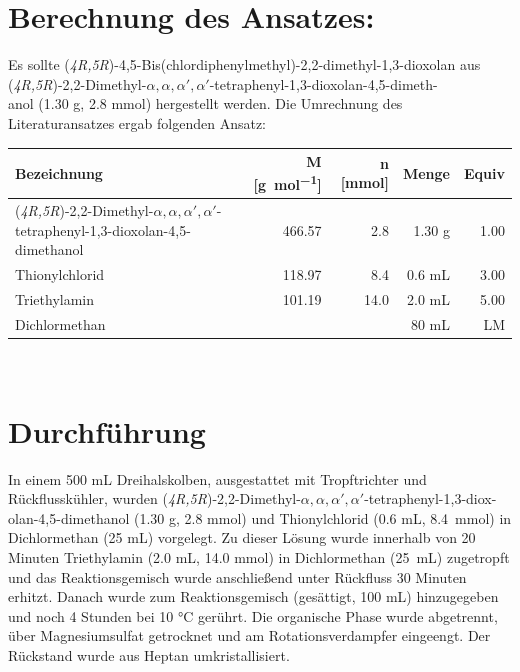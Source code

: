 \documentclass[12pt]{article}
\begin{document}
\begin{onehalfspace}

\section{Berechnung des Ansatzes: }
Es sollte (\textit{4R,5R})-4,5-Bis(chlordiphenylmethyl)-2,2-dimethyl-1,3-dioxolan aus (\textit{4R,5R})-2,2-Dimethyl-$\alpha ,\alpha ,\alpha ',\alpha '$-tetraphenyl-1,3-dioxolan-4,5-dimeth-\\anol (1.30 \si{\gram}, 2.8 mmol) hergestellt werden. Die Umrechnung des Literaturansatzes ergab folgenden Ansatz:\cite{vor}

\begin{table}
\begin{tabularx}{\textwidth}{Xrrrr}
\toprule
\textbf{ Bezeichnung }&\textbf{M [\si{\gram\per\mol}]} & \textbf{ n [\si{\milli\mol}]} & \textbf{Menge} & \textbf{Equiv}\\
\midrule
(\textit{4R,5R})-2,2-Dimethyl-$\alpha ,\alpha ,\alpha ',\alpha '$-tetraphenyl-1,3-dioxolan-4,5-dimethanol & 466.57 & 2.8  & 1.30 \si{\gram} & 1.00 \\
 Thionylchlorid  & 118.97   &  8.4  &  0.6 \si{\milli\liter} & 3.00 \\
 Triethylamin    & 101.19   &  14.0 &  2.0 \si{\milli\liter} & 5.00 \\
 Dichlormethan &   &  & 80 \si{\milli\liter}& LM \\
\bottomrule
\end{tabularx}\\
\end{table}

\section{Durchführung \cite{vor}}
In einem 500 \si{\milli\liter} Dreihalskolben, ausgestattet mit Tropftrichter und Rückflusskühler, wurden (\textit{4R,5R})-2,2-Dimethyl-$\alpha ,\alpha ,\alpha ',\alpha '$-tetraphenyl-1,3-diox-olan-4,5-dimethanol (1.30 \si{\gram}, 2.8 \si{\milli\mol}) und Thionylchlorid (0.6 \si{\milli\liter}, 8.4~\si{\milli\mol}) in Dichlormethan (25 \si{\milli\liter}) vorgelegt. Zu dieser Lösung wurde innerhalb von 20 Minuten Triethylamin (2.0 \si{\milli\liter}, 14.0 \si{\milli\mol}) in Dichlormethan (25~\si{\milli\liter}) zugetropft und das Reaktionsgemisch wurde anschließend unter Rückfluss 30 Minuten erhitzt. Danach wurde zum Reaktionsgemisch  (gesättigt, 100 \si{\milli\liter}) hinzugegeben und noch 4 Stunden bei 10 \si{\celsius} gerührt. Die organische Phase wurde abgetrennt, über Magnesiumsulfat getrocknet und am Rotationsverdampfer eingeengt. Der Rückstand wurde aus Heptan umkristallisiert.

\end{onehalfspace}
\end{document}
